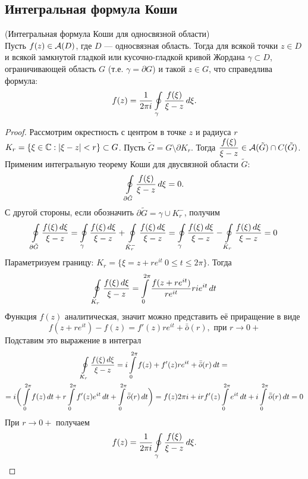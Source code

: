 	\subsection{Интегральная формула Коши}
	\begin{theorem*}
		(Интегральная формула Коши для односвязной области)\\
		\indent Пусть $f(z)\in \mathcal{A}(D)$, где $D$ --- односвязная область. Тогда для всякой точки $z\in D$ и всякой замкнутой гладкой или кусочно-гладкой кривой Жордана $\gamma\subset D$, ограничивающей область $G$ (т.е. $\gamma = \partial G$) и такой $z\in G$, что справедлива формула:
		\[ f(z) = \frac{1}{2\pi i}\oint\limits_\gamma \frac{f(\xi)}{\xi - z}\,d\xi. \]
	\end{theorem*}
	\begin{proof}
		Рассмотрим окрестность с центром в точке $z$ и радиуса $r$\\
		$K_r = \{\xi\in\mathbb{C}:|\xi - z| < r\} \subset G$.
		Пусть $\tilde{G} = G \setminus \partial K_r$. Тогда
		$\dfrac{f(\xi)}{\xi - z} \in \mathcal{A}(\tilde G)\cap C(\tilde G)$.
		Применим интегральную теорему Коши для двусвязной области $\tilde G$:
		\[ \oint\limits_{\partial\tilde G}\frac{f(\xi)}{\xi - z}\,d\xi = 0. \]
		С другой стороны, если обозначить $\partial\tilde G = \gamma\cup K_r^-$, получим
		\[  \oint\limits_{\partial\tilde G}\frac{f(\xi)\,d\xi}{\xi - z} = \oint\limits_\gamma \frac{f(\xi)\,d\xi}{\xi - z} + \oint\limits_{\bar K_r^-}\frac{f(\xi)\,d\xi}{\xi - z} = \oint\limits_\gamma\frac{f(\xi)\,d\xi}{\xi - z} - \oint\limits_{\bar K_r} \frac{f(\xi)\,d\xi}{\xi - z} = 0 \]
		Параметризуем границу: $K_r = \{\xi = z + re^{it}\ 0 \leqslant t \leqslant 2\pi \}$. Тогда
		\[ \oint\limits_{K_r}\frac{f(\xi)\,d\xi}{\xi - z} = \int\limits_0^{2\pi} \frac{f(z + re^{it})}{re^{it}}rie^{it}\,dt \]
		Функция $f(z)$ аналитическая, значит можно представить её приращение в виде 
		\[ f(z + re^{it}) - f(z) = f'(z)re^{it} + \bar{\bar o}(r),\text{ при } r\to 0+ \]
		Подставим это выражение в интеграл
		\begin{multline*}
			\oint\limits_{K_r}\frac{f(\xi)\,d\xi}{\xi - z} = i\int\limits_0^{2\pi}f(z)+f'(z)re^{it} + \bar{\bar o}(r)\,dt =\\=i\bigg(\int\limits_0^{2\pi} f(z)\,dt + r \int\limits_0^{2\pi} f'(z)e^{it}\,dt + \int\limits_0^{2\pi} \bar{\bar o}(r)\,dt\bigg) = f(z)2\pi i + irf'(z)\int\limits_0^{2\pi}e^{it}\,dt + i\int\limits_0^{2\pi} \bar{\bar o}(r)\,dt = 0
		\end{multline*}
		При $r\to 0+$ получаем
		\[ f(z) = \frac{1}{2\pi i}\oint\limits_\gamma \frac{f(\xi)}{\xi - z}\,d\xi. \]
	\end{proof}
